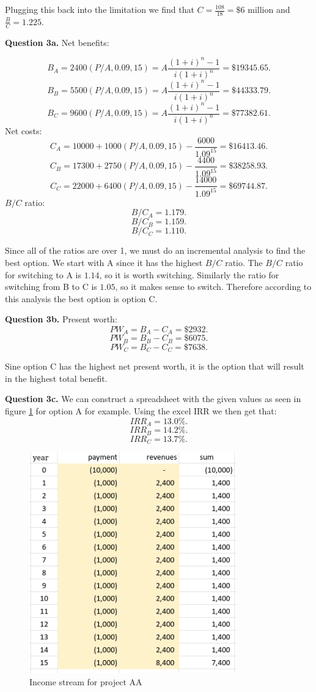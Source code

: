\documentclass[letterpaper, reqno,11pt]{article}
\begin{document}
Plugging this back into the limitation we find that $C=\frac{108}{18}=\$6$ million and $\frac{B}{C}=1.225$. 

{\noindent\bf Question 3a.} Net benefits: 

\[
B_A=2400 (P/A, 0.09, 15)=A \frac{(1+i)^{n}-1}{i(1+i)^{n}}=\$19345.65
.\]
\[
B_B=5500 (P/A, 0.09, 15)=A \frac{(1+i)^{n}-1}{i(1+i)^{n}}=\$44333.79
.\]
\[
B_C=9600 (P/A, 0.09, 15)=A \frac{(1+i)^{n}-1}{i(1+i)^{n}}=\$77382.61
.\]
Net costs: 
\[
C_A=10000+1000 (P/A, 0.09, 15)-\frac{6000}{1.09^{15}}=\$16413.46
.\]
\[
C_B=17300+2750 (P/A, 0.09, 15)-\frac{4400}{1.09^{15}}=\$38258.93
.\]
\[
C_C=22000+6400 (P/A, 0.09, 15)-\frac{14000}{1.09^{15}}=\$69744.87
.\]
$B /C$ ratio: 
\[
B /C_A=1.179
.\]
\[
B /C_B=1.159
.\]
\[
B /C_C=1.110
.\]

Since all of the ratios are over 1, we must do an incremental analysis to find the best option. We start with A since it has the highest $B /C$ ratio. The $B /C$ ratio for switching to A is $1.14$, so it is worth switching. Similarly the ratio for switching from B to C is $1.05$, so it makes sense to switch. Therefore according to this analysis the best option is option C. 

{\noindent\bf Question 3b.} Present worth: 
\[
PW_A=B_A-C_A=\$2932
.\]
\[
PW_B=B_B-C_B=\$6075
.\]
\[
PW_C=B_C-C_C=\$7638
.\]

Sine option C has the highest net present worth, it is the option that will result in the highest total benefit. 

{\noindent\bf Question 3c.} We can construct a spreadsheet with the given values as seen in figure \ref{fig:q3} for option A for example. Using the excel IRR we then get that: 
\[
IRR_A=13.0\%
.\]
\[
IRR_B=14.2\%
.\]
\[
IRR_C=13.7\%
.\]

\begin{figure}[htpb]
    \centering
    \includegraphics[width=0.8\textwidth]{q3}
    \caption{Income stream for project AA}
    \label{fig:q3}
\end{figure}
\end{document}
